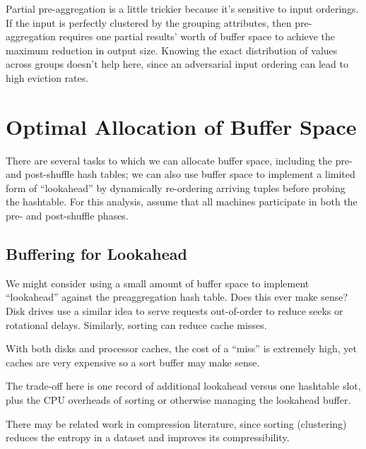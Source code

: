 \documentclass[12pt]{article}
\begin{document}
Partial pre-aggregation is a little trickier because it's sensitive to input orderings.  If the input is perfectly clustered by the grouping attributes, then pre-aggregation requires one partial results' worth of buffer space to achieve the maximum reduction in output size.  Knowing the exact distribution of values across groups doesn't help here, since an adversarial input ordering can lead to high eviction rates.

\section{Optimal Allocation of Buffer Space}
There are several tasks to which we can allocate buffer space, including the pre- and post-shuffle hash tables; we can also use buffer space to implement a limited form of ``lookahead'' by dynamically re-ordering arriving tuples before probing the hashtable.  For this analysis, assume that all machines participate in both the pre- and post-shuffle phases.


\subsection{Buffering for Lookahead}

We might consider using a small amount of buffer space to implement ``lookahead'' against the preaggregation hash table.
Does this ever make sense?
Disk drives use a similar idea to serve requests out-of-order to reduce seeks or rotational delays.
Similarly, sorting can reduce cache misses.

With both disks and processor caches, the cost of a ``miss'' is extremely high, yet caches are very expensive so a sort buffer may make sense.

The trade-off here is one record of additional lookahead versus one hashtable slot, plus the CPU overheads of sorting or otherwise managing the lookahead buffer.

There may be related work in compression literature, since sorting (clustering) reduces the entropy in a dataset and improves its compressibility.
\end{document}
